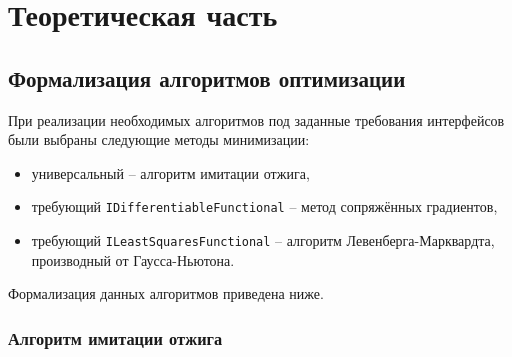 \chapter{Теоретическая часть}

\section{Формализация алгоритмов оптимизации}

При реализации необходимых алгоритмов под заданные требования интерфейсов были выбраны следующие методы минимизации: 

\begin{itemize}
	\item универсальный -- алгоритм имитации отжига,
	\item требующий \texttt{IDifferentiableFunctional} -- метод сопряжённых градиентов,
	\item требующий \texttt{ILeastSquaresFunctional} -- алгоритм Левенберга-Марквардта, производный от Гаусса-Ньютона.
\end{itemize}

Формализация данных алгоритмов приведена ниже.

\subsection{Алгоритм имитации отжига}

